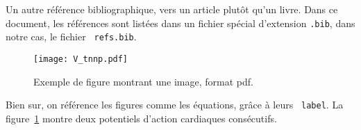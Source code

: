 \documentclass[a4paper,12pt,twoside]{report}
\begin{document}
Un autre référence bibliographique, vers un article \cite{rush_larsen.1978}
plutôt qu'un livre. Dans ce document, les références sont listées dans un
fichier spécial d'extension {\tt .bib}, dans notre cas, le fichier {\tt
  refs.bib}.
\begin{figure}[htpb!]
  \centering
  \texttt{[image: V\_tnnp.pdf]}
  \caption{Exemple de figure montrant une image, format pdf.}
  \label{fig:exemple}
\end{figure}

Bien sur, on référence les figures comme les équations, grâce à leurs {\tt
  label}. La figure~\ref{fig:exemple} montre deux potentiels d'action cardiaques
consécutifs.

\cleardoublepage


\end{document}
